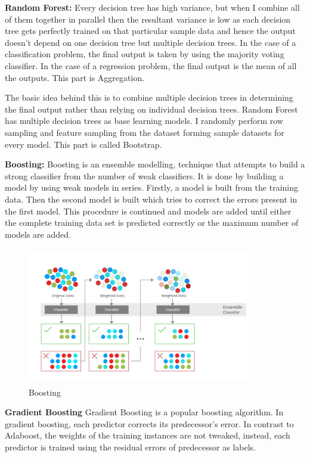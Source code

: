 \documentclass[12pt]{article}
\begin{document}
\textbf{Random Forest:}
Every decision tree has high variance, but when I combine all of them together in parallel then the resultant variance is low as each decision tree gets perfectly trained on that particular sample data and hence the output doesn’t depend on one decision tree but multiple decision trees. In the case of a classification problem, the final output is taken by using the majority voting classifier. In the case of a regression problem, the final output is the mean of all the outputs. This part is Aggregation.
 

The basic idea behind this is to combine multiple decision trees in determining the final output rather than relying on individual decision trees.
Random Forest has multiple decision trees as base learning models. I randomly perform row sampling and feature sampling from the dataset forming sample datasets for every model. This part is called Bootstrap.

\textbf{Boosting:}
Boosting is an ensemble modelling, technique that attempts to build a strong classifier from the number of weak classifiers. It is done by building a model by using weak models in series. Firstly, a model is built from the training data. Then the second model is built which tries to correct the errors present in the first model. This procedure is continued and models are added until either the complete training data set is predicted correctly or the maximum number of models are added.

\begin{figure}[H]
\begin{center}
 \includegraphics[width=10cm, height=6cm]{Tech2}
\caption{Boosting}
\end{center}
\end{figure}

\textbf{Gradient Boosting }
Gradient Boosting is a popular boosting algorithm. In gradient boosting, each predictor corrects its predecessor’s error. In contrast to Adaboost, the weights of the training instances are not tweaked, instead, each predictor is trained using the residual errors of predecessor as labels.
\end{document}
